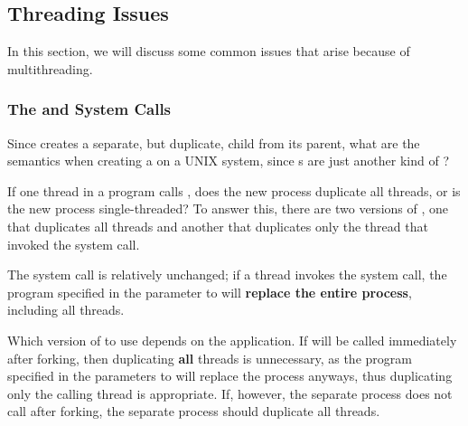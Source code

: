 \subsection{Threading Issues}\label{subsec:Threading_Issues}
In this section, we will discuss some common issues that arise because of multithreading.

\subsubsection{The \texorpdfstring{}{\texttt{fork()}} and \texorpdfstring{}{\texttt{exec()}} System Calls}\label{subsubsec:Fork_Exec_System_Calls}
Since  creates a separate, but duplicate, child  from its parent, what are the semantics when creating a  on a UNIX system, since s are just another kind of ?

If one thread in a program calls , does the new process duplicate all threads, or is the new process single-threaded?
To answer this, there are two versions of , one that duplicates all threads and another that duplicates only the thread that invoked the  system call.

The  system call is relatively unchanged; if a thread invokes the  system call, the program specified in the parameter to  will \textbf{replace the entire process}, including all threads.

Which version of  to use depends on the application.
If  will be called immediately after forking, then duplicating \textbf{all} threads is unnecessary, as the program specified in the parameters to  will replace the process anyways, thus duplicating only the calling thread is appropriate.
If, however, the separate process does not call  after forking, the separate process should duplicate all threads.

